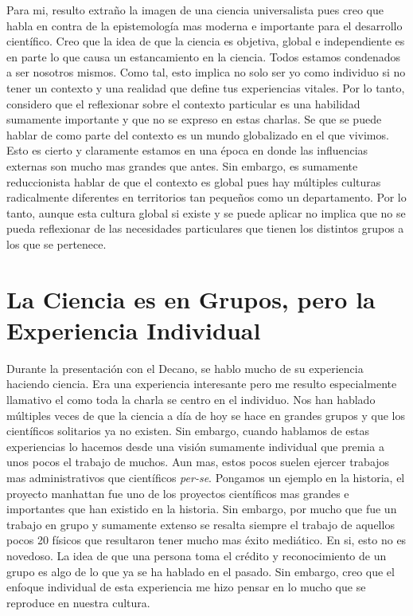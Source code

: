\documentclass[12pt]{exam}
\begin{document}
Para mi, resulto extraño la imagen de una ciencia universalista pues creo que habla en contra de la epistemología mas moderna e importante para el desarrollo científico. Creo que la idea de que la ciencia es objetiva, global e independiente es en parte lo que causa un estancamiento en la ciencia. Todos estamos condenados a ser nosotros mismos. Como tal, esto implica no solo ser yo como individuo si no tener un contexto y una realidad que define tus experiencias vitales. Por lo tanto, considero que el reflexionar sobre el contexto particular es una habilidad sumamente importante y que no se expreso en estas charlas. Se que se puede hablar de como parte del contexto es un mundo globalizado en el que vivimos. Esto es cierto y claramente estamos en una época en donde las influencias externas son mucho mas grandes que antes. Sin embargo, es sumamente reduccionista hablar de que el contexto es global pues hay múltiples culturas radicalmente diferentes en territorios tan pequeños como un departamento. Por lo tanto, aunque esta cultura global si existe y se puede aplicar no implica que no se pueda reflexionar de las necesidades particulares que tienen los distintos grupos a los que se pertenece.

\section*{La Ciencia es en Grupos, pero la Experiencia Individual}

Durante la presentación con el Decano, se hablo mucho de su experiencia haciendo ciencia. Era una experiencia interesante pero me resulto especialmente llamativo el como toda la charla se centro en el individuo. Nos han hablado múltiples veces de que la ciencia a día de hoy se hace en grandes grupos y que los científicos solitarios ya no existen. Sin embargo, cuando hablamos de estas experiencias lo hacemos desde una visión sumamente individual que premia a unos pocos el trabajo de muchos. Aun mas, estos pocos suelen ejercer trabajos mas administrativos que científicos \textit{per-se}. Pongamos un ejemplo en la historia, el proyecto manhattan fue uno de los proyectos científicos mas grandes e importantes que han existido en la historia. Sin embargo, por mucho que fue un trabajo en grupo y sumamente extenso se resalta siempre el trabajo de aquellos pocos 20 físicos que resultaron tener mucho mas éxito mediático. En si, esto no es novedoso. La idea de que una persona toma el crédito y reconocimiento de un grupo es algo de lo que ya se ha hablado en el pasado. Sin embargo, creo que el enfoque individual de esta experiencia me hizo pensar en lo mucho que se reproduce en nuestra cultura. 
\end{document}
